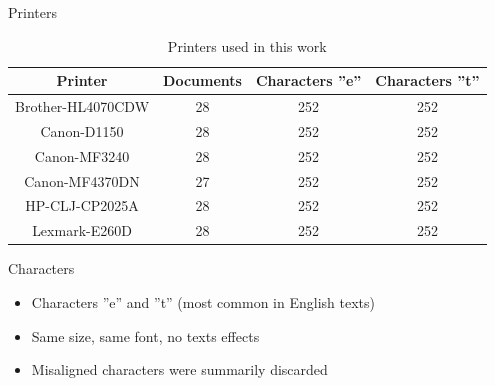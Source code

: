 \documentclass[notes]{beamer}
\begin{document}
\begin{frame}

\begin{block}{Printers}

\begin{table}
\caption{Printers used in this work}
\label{tab:printers}
\begin{small}
\begin{center}
\begin{tabular}{ | c | c | c | c |}
\hline
Printer & Documents & Characters ''e'' & Characters ''t'' \\ \hline
Brother-HL4070CDW & 28 & 252 & 252\\
Canon-D1150 & 28 & 252 & 252\\
Canon-MF3240 & 28 & 252 & 252\\
Canon-MF4370DN & 27 & 252 & 252 \\
HP-CLJ-CP2025A & 28 & 252 & 252\\
Lexmark-E260D & 28 & 252 & 252\\
\hline
\end{tabular}
\end{center}   
\end{small} 
\end{table}

\end{block}

\end{frame}

\begin{frame}

\begin{block}{Characters}

\begin{itemize}

\item Characters ''e'' and ''t'' (most common in English texts)

\item Same size, same font, no texts effects

\item Misaligned characters were summarily discarded

\end{itemize}

\end{block}

\end{frame}
\end{document}
